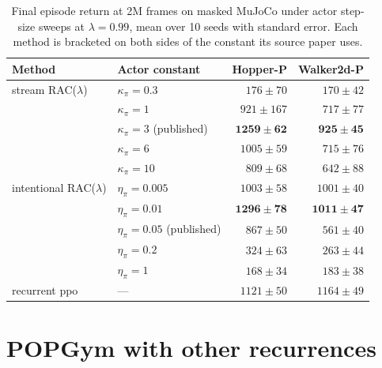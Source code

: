 \documentclass{article}
\begin{document}
\begin{table}[htbp]
\centering
\caption{Final episode return at 2M frames on masked MuJoCo under actor step-size sweeps at
$\lambda = 0.99$, mean over 10 seeds with standard error. Each method is bracketed on both sides
of the constant its source paper uses.}
\label{tab:stepsize}
\begin{tabular}{llrr}
\toprule
Method & Actor constant & Hopper-P & Walker2d-P \\
\midrule
stream RAC($\lambda$)      & $\kappa_\pi = 0.3$          & $176 \pm 70$   & $170 \pm 42$ \\
                           & $\kappa_\pi = 1$            & $921 \pm 167$  & $717 \pm 77$ \\
                           & $\kappa_\pi = 3$ (published) & $\mathbf{1259 \pm 62}$ & $\mathbf{925 \pm 45}$ \\
                           & $\kappa_\pi = 6$            & $1005 \pm 59$  & $715 \pm 76$ \\
                           & $\kappa_\pi = 10$           & $809 \pm 68$   & $642 \pm 88$ \\
\midrule
intentional RAC($\lambda$) & $\eta_\pi = 0.005$          & $1003 \pm 58$  & $1001 \pm 40$ \\
                           & $\eta_\pi = 0.01$           & $\mathbf{1296 \pm 78}$ & $\mathbf{1011 \pm 47}$ \\
                           & $\eta_\pi = 0.05$ (published) & $867 \pm 50$ & $561 \pm 40$ \\
                           & $\eta_\pi = 0.2$            & $324 \pm 63$   & $263 \pm 44$ \\
                           & $\eta_\pi = 1$              & $168 \pm 34$   & $183 \pm 38$ \\
\midrule
recurrent \gls{ppo}        & ---                         & $1121 \pm 50$  & $1164 \pm 49$ \\
\bottomrule
\end{tabular}
\end{table}

\section{POPGym with other recurrences}
\label{sec:popgym-cells}
\end{document}
